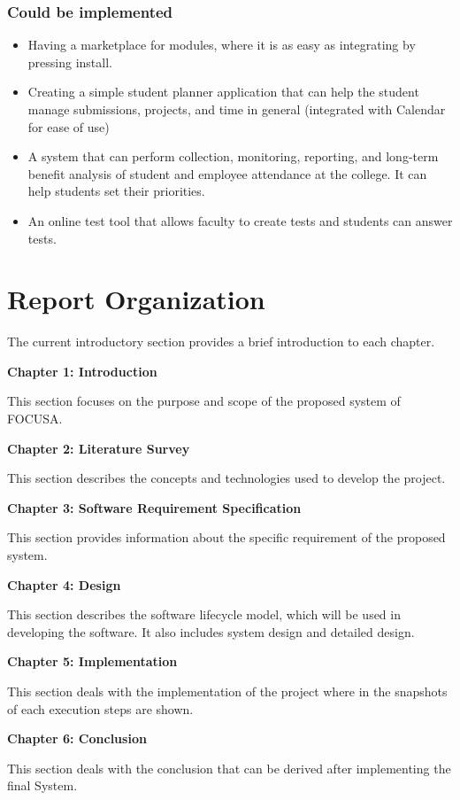 \subsubsection{Could be implemented}
\begin{itemize}
    \item Having a marketplace for modules, where it is as easy as integrating by pressing install.
    \item Creating a simple student planner application that can help the student manage submissions, 
    projects, and time in general (integrated with Calendar for ease of use)
    \item A system that can perform collection, monitoring, reporting, and long-term benefit analysis 
    of student and employee attendance at the college. It can help students set their priorities.
    \item An online test tool that allows faculty to create tests and students can answer tests.
\end{itemize}

\section{Report Organization}

The current introductory section provides a brief introduction to each chapter.

\textbf{Chapter 1: Introduction}

This section focuses on the purpose and scope of the proposed system of FOCUSA.

\textbf{Chapter 2: Literature Survey}

This section describes the concepts and technologies used to develop the project.

\textbf{Chapter 3: Software Requirement Specification}

This section provides information about the specific requirement of the proposed system.

\textbf{Chapter 4: Design}

This section describes the software lifecycle model, which will be used in developing the
software. It also includes system design and detailed design.

\textbf{Chapter 5: Implementation}

This section deals with the implementation of the project where in the snapshots of each execution steps are shown.

\textbf{Chapter 6: Conclusion}

This section deals with the conclusion that can be derived after implementing the final System.
